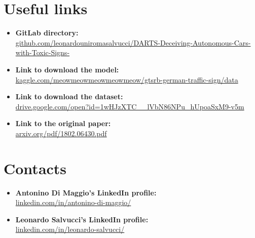 \section*{Useful links}
\begin{itemize}
\item \textbf{GitLab directory:}\\
\url{github.com/leonardouniromasalvucci/DARTS-Deceiving-Autonomous-Cars-with-Toxic-Signs-}\\

\item \textbf{Link to download the model:}\\
\url{kaggle.com/meowmeowmeowmeowmeow/gtsrb-german-traffic-sign/data}\\

\item \textbf{Link to download the dataset:}\\
\url{drive.google.com/open?id=1wHJzXTC__lVbN86NPu_hUpoaSxM9-v5m}\\

\item \textbf{Link to the original paper:}\\
\url{arxiv.org/pdf/1802.06430.pdf}\\
\end{itemize}

\section*{Contacts}
\begin{itemize}
\item \textbf{Antonino Di Maggio's LinkedIn profile:}\\
\url{linkedin.com/in/antonino-di-maggio/}\\

\item \textbf{Leonardo Salvucci's LinkedIn profile:}\\
\url{linkedin.com/in/leonardo-salvucci/}\\
\end{itemize}


 



